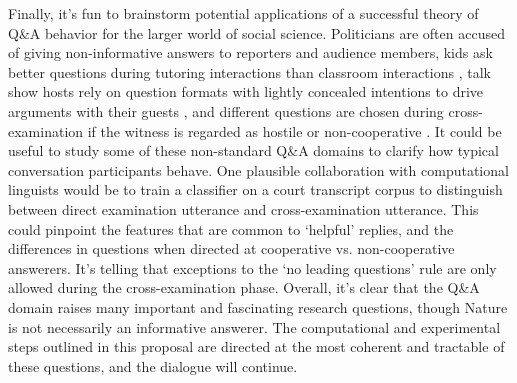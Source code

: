 \documentclass[12pt]{amsart}
\begin{document}
Finally, it's fun to brainstorm potential applications of a successful theory of Q\&A behavior for the larger world of social science. Politicians are often accused of giving non-informative answers to reporters and audience members\cite{Bull94_QuestionsRepliesNonRepliesPoliticalInterviews}, kids ask better questions during tutoring interactions than classroom interactions \cite{GraesserPerson94_QuestionAskingTutoring}, talk show hosts rely on  question formats with lightly concealed intentions to drive arguments with their guests \cite{Ilie99_Q_and_A_TalkShows}, and different questions are chosen during cross-examination if the witness is regarded as hostile or non-cooperative  \cite{Wellman97_CrossExamination}. It could be useful to study some of these non-standard Q\&A domains to clarify how typical conversation participants behave.  One plausible collaboration with computational linguists would be to train a classifier on a court transcript corpus to distinguish between direct examination utterance and cross-examination utterance. This could pinpoint the features that are common to `helpful' replies, and the differences in questions when directed at cooperative vs. non-cooperative answerers. It's telling that exceptions to the `no leading questions' rule are only allowed during the cross-examination phase. Overall, it's clear that the Q\&A domain raises many important and fascinating research questions, though Nature is not necessarily an informative answerer. The computational and experimental steps outlined in this proposal are directed at the most coherent and tractable of these questions, and the dialogue will continue.




\end{document}
